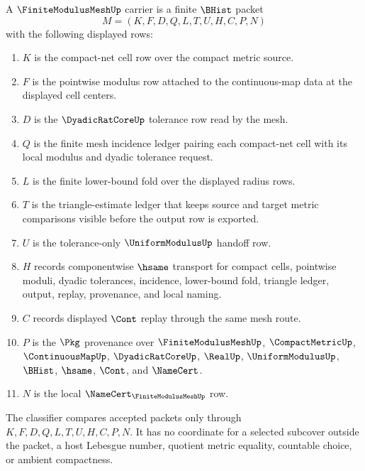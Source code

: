\begin{definition}
\label{def:finite-modulus-mesh-carrier}
A $\FiniteModulusMeshUp$ carrier is a finite $\BHist$ packet
$$
M=(K,F,D,Q,L,T,U,H,C,P,N)
$$
with the following displayed rows:
\begin{enumerate}
\item $K$ is the compact-net cell row over the compact metric source.
\item $F$ is the pointwise modulus row attached to the continuous-map data at the displayed cell centers.
\item $D$ is the $\DyadicRatCoreUp$ tolerance row read by the mesh.
\item $Q$ is the finite mesh incidence ledger pairing each compact-net cell with its local modulus and dyadic tolerance request.
\item $L$ is the finite lower-bound fold over the displayed radius rows.
\item $T$ is the triangle-estimate ledger that keeps source and target metric comparisons visible before the output row is exported.
\item $U$ is the tolerance-only $\UniformModulusUp$ handoff row.
\item $H$ records componentwise $\hsame$ transport for compact cells, pointwise moduli, dyadic tolerances, incidence, lower-bound fold, triangle ledger, output, replay, provenance, and local naming.
\item $C$ records displayed $\Cont$ replay through the same mesh route.
\item $P$ is the $\Pkg$ provenance over $\FiniteModulusMeshUp$, $\CompactMetricUp$, $\ContinuousMapUp$, $\DyadicRatCoreUp$, $\RealUp$, $\UniformModulusUp$, $\BHist$, $\hsame$, $\Cont$, and $\NameCert$.
\item $N$ is the local $\NameCert_{\FiniteModulusMeshUp}$ row.
\end{enumerate}
The classifier compares accepted packets only through $K,F,D,Q,L,T,U,H,C,P,N$. It has no coordinate for a selected subcover outside the packet, a host Lebesgue number, quotient metric equality, countable choice, or ambient compactness.
\end{definition}

